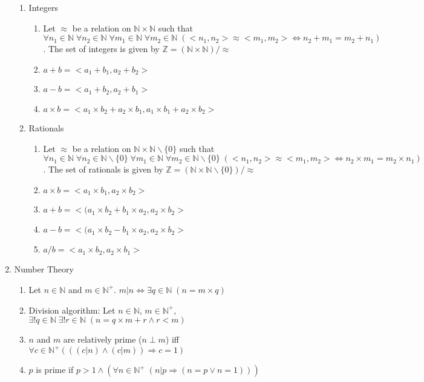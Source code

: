 \documentclass[11pt, twocolumn]{article}
\theoremstyle{definition} \newtheorem*{solution}{Solution}
\begin{document}
\begin{enumerate}
\begin{enumerate}
\item Integers
\begin{enumerate}
\item Let $\approx$ be a relation on $\mathbb{N} \times \mathbb{N}$ such that $\forall n_1 \in \mathbb{N} \; \forall n_2 \in \mathbb{N} \; \forall m_1 \in \mathbb{N} \; \forall m_2 \in \mathbb{N} \;(<n_1, n_2> \approx <m_1, m_2> \Leftrightarrow n_2+m_1=m_2+n_1)$. The set of integers is given by $\mathbb{Z} = (\mathbb{N} \times \mathbb{N})/\approx$
\item $a+b = <a_1+b_1, a_2+b_2>$
\item $a-b = <a_1+b_2, a_2+b_1>$
\item $a\times b = <a_1\times b_2+a_2\times b_1, a_1\times b_1+a_2\times b_2 >$
\end{enumerate}
\item Rationals
\begin{enumerate}
\item Let $\approx$ be a relation on $\mathbb{N} \times \mathbb{N}\backslash\{0\}$ such that $\forall n_1 \in \mathbb{N} \; \forall n_2 \in \mathbb{N}\backslash \{0\} \; \forall m_1 \in \mathbb{N} \; \forall m_2 \in \mathbb{N}\backslash\{0\} \;(<n_1, n_2> \approx <m_1, m_2> \Leftrightarrow n_2\times m_1=m_2\times n_1)$. The set of rationals is given by $\mathbb{Z} = (\mathbb{N} \times \mathbb{N}\backslash \{0\})/\approx$
\item $a\times b = <a_1\times b_1, a_2\times b_2>$
\item $a+b = <(a_1\times b_2+b_1\times a_2, a_2\times b_2>$
\item $a-b = <(a_1\times b_2-b_1\times a_2, a_2\times b_2>$
\item $a/b = <a_1\times b_2, a_2\times b_1>$
\end{enumerate}
\end{enumerate}
\item Number Theory
\begin{enumerate}
\item Let $n\in \mathbb{N}$ and $m\in \mathbb{N}^+$. $m | n \Leftrightarrow \exists q \in \mathbb{N} \; (n=m\times q)$
\item Division algorithm: Let $n\in \mathbb{N}$, $m\in \mathbb{N}^+$, $\exists !q\in \mathbb{N} \; \exists !r\in \mathbb{N} \;(n=q\times m+r \wedge r<m)$
\item $n$ and $m$ are relatively prime ($n\perp m$) iff $\forall c\in \mathbb{N}^+ (((c|n)\wedge (c|m))\Rightarrow c=1)$
\item $p$ is prime if $p>1 \wedge (\forall n \in \mathbb{N}^+\;(n|p\Rightarrow (n=p\vee n=1)))$

\end{enumerate}
\end{enumerate}
\end{document}
